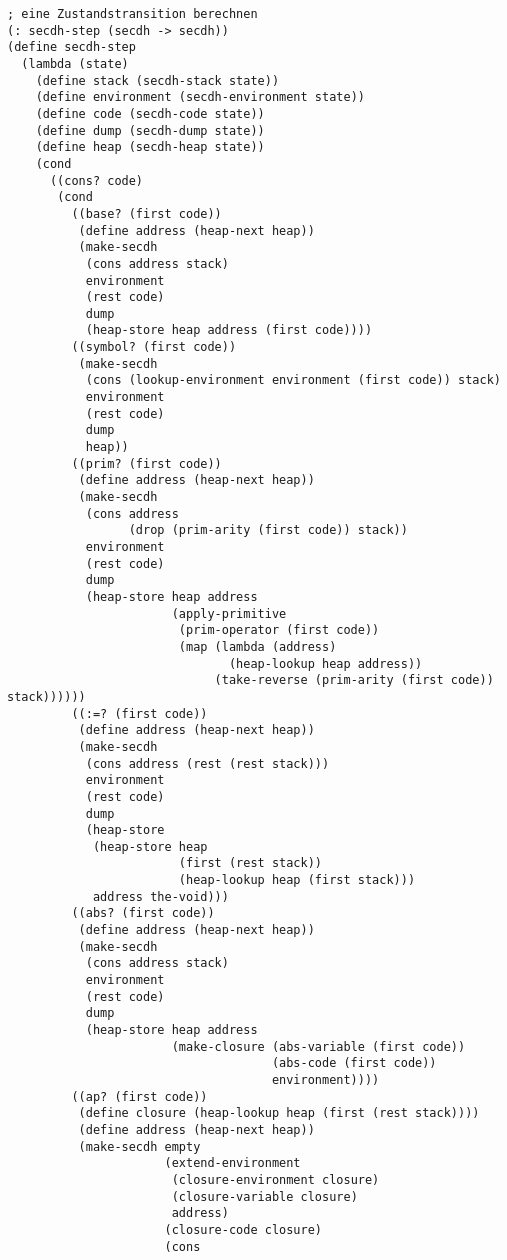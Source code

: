 \begin{lstlisting}
; eine Zustandstransition berechnen
(: secdh-step (secdh -> secdh))
(define secdh-step
  (lambda (state)
    (define stack (secdh-stack state))
    (define environment (secdh-environment state))
    (define code (secdh-code state))
    (define dump (secdh-dump state))
    (define heap (secdh-heap state))
    (cond
      ((cons? code)
       (cond
         ((base? (first code))
          (define address (heap-next heap))
          (make-secdh
           (cons address stack)
           environment
           (rest code)
           dump
           (heap-store heap address (first code))))
         ((symbol? (first code))
          (make-secdh
           (cons (lookup-environment environment (first code)) stack)
           environment
           (rest code)
           dump
           heap))
         ((prim? (first code))
          (define address (heap-next heap))
          (make-secdh
           (cons address
                 (drop (prim-arity (first code)) stack))
           environment
           (rest code)
           dump
           (heap-store heap address
                       (apply-primitive
                        (prim-operator (first code))
                        (map (lambda (address)
                               (heap-lookup heap address))
                             (take-reverse (prim-arity (first code)) stack))))))
         ((:=? (first code))
          (define address (heap-next heap))
          (make-secdh
           (cons address (rest (rest stack)))
           environment
           (rest code)
           dump
           (heap-store
            (heap-store heap
                        (first (rest stack)) 
                        (heap-lookup heap (first stack)))
            address the-void)))
         ((abs? (first code))
          (define address (heap-next heap))
          (make-secdh
           (cons address stack)
           environment
           (rest code)
           dump
           (heap-store heap address
                       (make-closure (abs-variable (first code))
                                     (abs-code (first code))
                                     environment))))
         ((ap? (first code))
          (define closure (heap-lookup heap (first (rest stack))))
          (define address (heap-next heap))
          (make-secdh empty
                      (extend-environment
                       (closure-environment closure)
                       (closure-variable closure)
                       address)
                      (closure-code closure)
                      (cons

\end{lstlisting}
